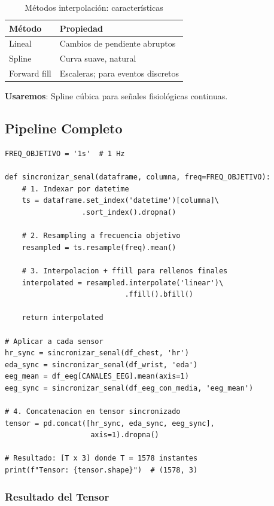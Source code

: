 \documentclass[11pt,twoside,a4paper]{article}
\begin{document}
\begin{table}[H]
\centering
\caption{Métodos interpolación: características}
\label{tab:interp_comp}
\begin{tabular}{|l|l|}
\hline
\textbf{Método} & \textbf{Propiedad} \\
\hline
Lineal & Cambios de pendiente abruptos \\
\hline
Spline & Curva suave, natural \\
\hline
Forward fill & Escaleras; para eventos discretos \\
\hline
\end{tabular}
\end{table}

\textbf{Usaremos}: Spline cúbica para señales fisiológicas continuas.

\subsection{Pipeline Completo}

\begin{lstlisting}[caption=Pipeline sincronización multimodal]
FREQ_OBJETIVO = '1s'  # 1 Hz

def sincronizar_senal(dataframe, columna, freq=FREQ_OBJETIVO):
    # 1. Indexar por datetime
    ts = dataframe.set_index('datetime')[columna]\
                  .sort_index().dropna()

    # 2. Resampling a frecuencia objetivo
    resampled = ts.resample(freq).mean()

    # 3. Interpolacion + ffill para rellenos finales
    interpolated = resampled.interpolate('linear')\
                            .ffill().bfill()

    return interpolated

# Aplicar a cada sensor
hr_sync = sincronizar_senal(df_chest, 'hr')
eda_sync = sincronizar_senal(df_wrist, 'eda')
eeg_mean = df_eeg[CANALES_EEG].mean(axis=1)
eeg_sync = sincronizar_senal(df_eeg_con_media, 'eeg_mean')

# 4. Concatenacion en tensor sincronizado
tensor = pd.concat([hr_sync, eda_sync, eeg_sync],
                    axis=1).dropna()

# Resultado: [T x 3] donde T = 1578 instantes
print(f"Tensor: {tensor.shape}")  # (1578, 3)
\end{lstlisting}

\subsubsection{Resultado del Tensor}
\end{document}
